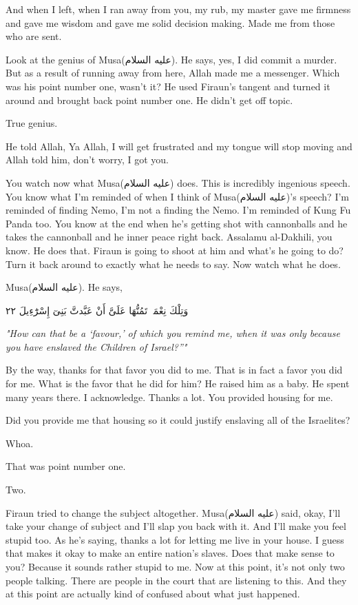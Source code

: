 \documentclass[12pt]{article}
\newcommand{\as}{\textarabic{(عليه السلام)}}
\begin{document}
And when I left, when I ran away from you, my rub, my master gave me firmness and gave me wisdom and gave me solid decision making. Made me from those who are sent. 

Look at the genius of Musa\as{}. He says, yes, I did commit a murder. But as a result of running away from here, Allah made me a messenger. Which was his point number one, wasn't it? He used Firaun's tangent and turned it around and brought back point number one. He didn't get off topic. 

True genius. 

He told Allah, Ya Allah, I will get frustrated and my tongue will stop moving and Allah told him, don't worry, I got you. 

You watch now what Musa\as{} does. This is incredibly ingenious speech. You know what I'm reminded of when I think of Musa\as{}'s speech? I'm reminded of finding Nemo, I'm not a finding the Nemo. I'm reminded of Kung Fu Panda too. You know at the end when he's getting shot with cannonballs and he takes the cannonball and he inner peace right back. Assalamu al-Dakhili, you know. He does that. Firaun is going to shoot at him and what's he going to do? Turn it back around to exactly what he needs to say. Now watch what he does. 

Musa\as{}. He says, 

\textarabic{وَتِلْكَ نِعْمَةٌۭ تَمُنُّهَا عَلَىَّ أَنْ عَبَّدتَّ بَنِىٓ إِسْرَٰٓءِيلَ ٢٢}

\textit{"How can that be a ‘favour,’ of which you remind me, when it was only because you have enslaved the Children of Israel?”"}

By the way, thanks for that favor you did to me. That is in fact a favor you did for me. What is the favor that he did for him? He raised him as a baby. He spent many years there. I acknowledge. Thanks a lot. You provided housing for me. 

Did you provide me that housing so it could justify enslaving all of the Israelites? 

Whoa. 

That was point number one. 

Two. 

Firaun tried to change the subject altogether. Musa\as{} said, okay, I'll take your change of subject and I'll slap you back with it. And I'll make you feel stupid too. As he's saying, thanks a lot for letting me live in your house. I guess that makes it okay to make an entire nation's slaves. Does that make sense to you? Because it sounds rather stupid to me. Now at this point, it's not only two people talking. There are people in the court that are listening to this. And they at this point are actually kind of confused about what just happened. 
\end{document}
